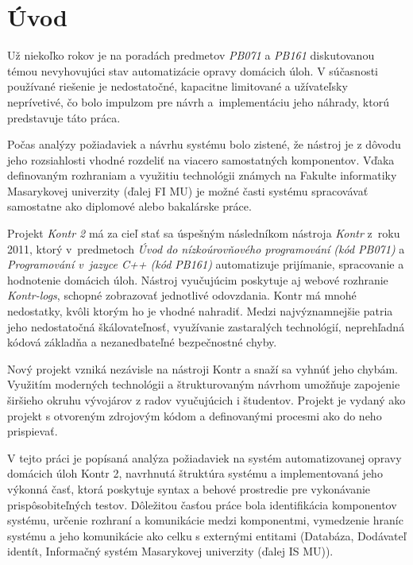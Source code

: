 \documentclass[
  digital, %
  oneside, %
  table,   %
  lof,     %
  lot,   %
]{fithesis3}
\begin{document}
\chapter*{Úvod}

Už niekoľko rokov je na poradách predmetov \textit{PB071} a \textit{PB161} diskutovanou témou nevyhovujúci stav automatizácie opravy domácich úloh. V súčasnosti používané riešenie je nedostatočné, kapacitne limitované a užívateľsky neprívetivé, čo bolo impulzom pre návrh a~implementáciu jeho náhrady, ktorú predstavuje táto práca.

Počas analýzy požiadaviek a návrhu systému bolo zistené, že nástroj je z dôvodu jeho rozsiahlosti vhodné rozdeliť na viacero samostatných komponentov. Vďaka definovaným rozhraniam a využitiu technológii známych na Fakulte informatiky Masarykovej univerzity (ďalej FI MU) je možné časti systému spracovávať samostatne ako diplomové alebo bakalárske práce.

Projekt \textit{Kontr 2} má za cieľ stať sa úspešným následníkom nástroja \textit{Kontr}\cite{kontr} z~roku 2011, ktorý v~predmetoch \emph{Úvod do nízkoúrovňového programování (kód PB071)} a \emph{Programování v~jazyce C++ (kód PB161)} automatizuje prijímanie, spracovanie a hodnotenie domácich úloh. Nástroj vyučujúcim poskytuje aj webové rozhranie \textit{Kontr-logs}\cite{KontrWeb}, schopné zobrazovať jednotlivé odovzdania. Kontr má mnohé nedostatky, kvôli ktorým ho je vhodné nahradiť. Medzi najvýznamnejšie patria jeho nedostatočná škálovateľnosť, využívanie zastaralých technológií, neprehľadná kódová základňa a nezanedbateľné bezpečnostné chyby.

Nový projekt vzniká nezávisle na nástroji Kontr a snaží sa vyhnúť jeho chybám. Využitím moderných technológii a štrukturovaným návrhom umožňuje zapojenie širšieho okruhu vývojárov z radov vyučujúcich i študentov. Projekt je vydaný ako projekt s otvoreným zdrojovým kódom a definovanými procesmi ako do neho prispievať.

V tejto práci je popísaná analýza požiadaviek na systém automatizovanej opravy domácich úloh Kontr 2, navrhnutá štruktúra systému a implementovaná jeho výkonná časť, ktorá poskytuje syntax a behové prostredie pre vykonávanie prispôsobiteľných testov. Dôležitou časťou práce bola identifikácia komponentov systému, určenie rozhraní a komunikácie medzi komponentmi, vymedzenie hraníc systému a jeho komunikácie ako celku s externými entitami (Databáza, Dodávateľ identít, Informačný systém Masarykovej univerzity (ďalej IS MU)).
\end{document}
